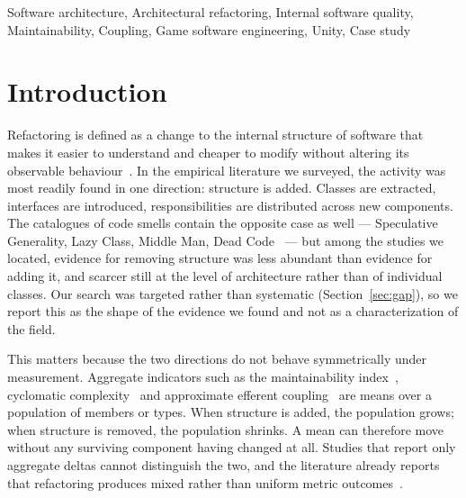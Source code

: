 \documentclass{sbc2019}%
\begin{document}
\begin{frontmatter}
\begin{abstract}
protocol in which retention decisions are recorded as outcomes, a control design separating dead-code removal from architectural change, and evidence that aggregate internal quality indicators are sensitive to population composition in ways that can invert their apparent direction.
\end{abstract}

\begin{keywords}
Software architecture, Architectural refactoring, Internal software quality, Maintainability, Coupling, Game software engineering, Unity, Case study
\end{keywords}

\end{frontmatter}


\section{Introduction}

Refactoring is defined as a change to the internal structure of software that
makes it easier to understand and cheaper to modify without altering its
observable behaviour~\cite{fowler2018,mens2004}. In the empirical literature we
surveyed, the activity was most readily found in one direction: structure is
added. Classes are extracted, interfaces are introduced, responsibilities are
distributed across new components. The catalogues of code smells contain the
opposite case as well --- Speculative Generality, Lazy Class, Middle Man, Dead
Code~\cite{fowler2018} --- but among the studies we located, evidence for
removing structure was less abundant than evidence for adding it, and scarcer
still at the level of architecture rather than of individual classes. Our search
was targeted rather than systematic (Section~\ref{sec:gap}), so we report this as
the shape of the evidence we found and not as a characterization of the field.

This matters because the two directions do not behave symmetrically under
measurement. Aggregate indicators such as the maintainability index~\cite{coleman1994}, cyclomatic complexity~\cite{mccabe1976} and approximate efferent
coupling~\cite{martin2003} are means over a population of members or types.
When structure is added, the population grows; when structure is removed, the
population shrinks. A mean can therefore move without any surviving component
having changed at all. Studies that report only aggregate deltas cannot
distinguish the two, and the literature already reports that refactoring
produces mixed rather than uniform metric outcomes~\cite{szoke2017,bavota2015,palomba2018}.
\end{document}

